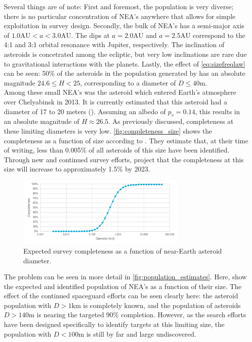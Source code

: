 Several things are of note: First and foremost, the population is very diverse; there is no particular concentration of NEA's anywhere that allows for simple exploitation in survey design. Secondly, the bulk of NEA's has a semi-major axis of $1.0 \mathrm{AU} < a < 3.0 \mathrm{AU}$. The dips at $a = 2.0 \mathrm{AU}$ and $a = 2.5 \mathrm{AU}$ correspond to the 4:1 and 3:1 orbital resonance with Jupiter, respectively. The inclination of asteroids is concetrated among the ecliptic, but very low inclinations are rare due to gravitational interactions with the planets. Lastly, the effect of \autoref{eq:sizefreqlaw} can be seen: 50\% of the asteroids in the population generated by \cite{GranvikPopulation} has an absolute magnitude $24.6 \leq H < 25$, corresponding to a diameter of $D \leq 40 \mathrm{m}$. \\

Among these small NEA's was the asteroid which entered Earth's atmosphere over Chelyabinsk in 2013. It is currently estimated that this asteroid had a diameter of 17 to 20 meters (\cite{ChelyabinskNASA}). Assuming an albedo of $p_v = 0.14$, this results in an absolute magnitude of $H \approx 26.5$. As previously discussed, completeness at these limiting diameters is very low. \autoref{fig:completeness_size} shows the completeness as a function of size according to \cite{HarrisPopulation}. They estimate that, at their time of writing, less than 0.005\% of all asteroids of this size have been identified. Through new and continued survey efforts, \cite{2017NEOSDT} project that the completeness at this size will increase to approximately 1.5\% by 2023. \\

\begin{figure}[htbp]
 \centering
 \includegraphics[width=0.75\textwidth]{img/completeness_size.pdf}
 \caption{Expected survey completeness as a function of near-Earth asteroid diameter. \cite{HarrisPopulation}}
 \label{fig:completeness_size}
\end{figure}

The problem can be seen in more detail in \autoref{fig:population_estimates}. Here, \cite{HarrisPopulation} show the expected and identified population of NEA's as a function of their size. The effect of the continued spaceguard efforts can be seen clearly here: the asteroid population with $D > 1 \mathrm{km}$ is completely known, and the population of asteroids $D > 140 \mathrm{m}$ is nearing the targeted 90\% completion. However, as the search efforts have been designed specifically to identify targets at this limiting size, the population with $D < 100 \mathrm{m}$ is still by far and large undiscovered.

